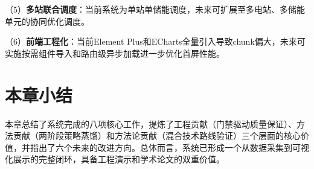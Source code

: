 \documentclass[12pt,a4paper]{ctexbook}
\begin{document}
（5）\textbf{多站联合调度}：当前系统为单站单储能调度，未来可扩展至多电站、多储能单元的协同优化调度。\cite{cn-storage-config-review-2025,bo-two-stage-rolling-2025,li-mpc-microgrid-2025}

（6）\textbf{前端工程化}：当前Element Plus和ECharts全量引入导致chunk偏大，未来可实施按需组件导入和路由级异步加载进一步优化首屏性能。

\section{本章小结}

本章总结了系统完成的八项核心工作，提炼了工程贡献（门禁驱动质量保证）、方法贡献（两阶段策略蒸馏）和方法论贡献（混合技术路线验证）三个层面的核心价值，并指出了六个未来的改进方向。总体而言，系统已形成一个从数据采集到可视化展示的完整闭环，具备工程演示和学术论文的双重价值。
\end{document}
